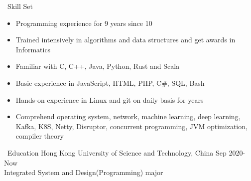 \documentclass{resume}
\begin{document}

\begin{rSection}{\faCogs~Skill Set}
    \begin{itemize}
        \itemsep -0.5em
        \item Programming experience for 9 years since 10
        \item Trained intensively in algorithms and data structures and get awards in Informatics
        \item Familiar with C, C++, Java, Python, Rust and Scala
        \item Basic experience in JavaScript, HTML, PHP, C\#, SQL, Bash
        \item Hands-on experience in Linux and git on daily basis for years
        \item Comprehend operating system, network, machine learning, deep learning, Kafka, K8S, Netty, Disruptor, concurrent programming, JVM optimization, compiler theory
    \end{itemize}
    
\end{rSection}

\begin{rSection}{\faGraduationCap~Education}
    Hong Kong University of Science and Technology, China \hfill Sep 2020-Now \\ Integrated System and Design(Programming) major
\end{rSection}
\end{document}
